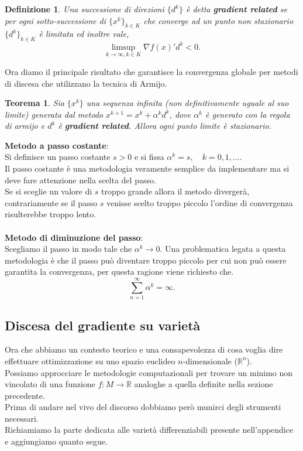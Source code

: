 \documentclass[a4paper, 12pt]{article}
\newtheorem{theorem}{Teorema}
\newtheorem{definition}{Definizione}
\begin{document}
\begin{definition}
Una successione di direzioni $\{d^k\}$ è detta \textbf{gradient related} se per ogni sotto-successione di $\{x^k\}_{k \in K}$ che converge ad un punto non stazionario $\{d^k\}_{k \in K}$ è limitata ed inoltre vale,\\
\[\limsup\limits_{k \to \infty, k \in K} \nabla f(x)'d^k < 0.\]
\end{definition}
Ora diamo il principale risultato che garantisce la convergenza globale per metodi di discesa che utilizzano la tecnica di Armijo.
\begin{theorem}
Sia $\{x^k\}$ una sequenza infinita (non definitivamente uguale al suo limite) generata dal metodo $x^{k+1} = x^k + \alpha^k d^k$, dove $\alpha^k$ è generato con la regola di armijo e $d^k$ è \textbf{gradient related}. Allora ogni punto limite è stazionario.
\end{theorem}
\textbf{Metodo a passo costante}:\\
Si definisce un passo costante $s > 0$ e si fissa $\alpha^k = s, \quad k = 0,1, ...$.\\
Il passo costante è una metodologia veramente semplice da implementare ma si deve fare attenzione nella scelta del passo.\\
Se si sceglie un valore di $s$ troppo grande allora il metodo divergerà, contrariamente se il passo $s$ venisse scelto troppo piccolo l'ordine di convergenza risulterebbe troppo lento.\\\\
\textbf{Metodo di diminuzione del passo}:\\
Scegliamo il passo in modo tale che $\alpha^k \rightarrow 0$. Una problematica legata a questa metodologia è che il passo può diventare troppo piccolo per cui non può essere garantita la convergenza, per questa ragione viene richiesto che.\\ \[\sum_{n=1}^{\infty} \alpha^k = \infty.\]
\subsection{Discesa del gradiente su varietà} \label{riemanniangd}
Ora che abbiamo un contesto teorico e una consapevolezza di cosa voglia dire effettuare ottimizzazione su uno spazio euclideo $n$-dimensionale ($\mathbb{R}^n$).\\
Possiamo approcciare le metodologie computazionali per trovare un minimo non vincolato di una funzione $f:M \to \mathbb{R}$ analoghe a quella definite nella sezione precedente.\\
Prima di andare nel vivo del discorso dobbiamo però munirci degli strumenti necessari.\\
Richiamiamo la parte dedicata alle varietà differenziabili presente nell'appendice e aggiungiamo quanto segue.
\end{document}
